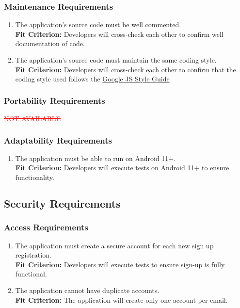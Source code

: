 \documentclass[12pt,letterpaper]{article}
\begin{document}
\subsubsection{Maintenance Requirements}
\begin{enumerate}[{MP}1.] 
	\item The application's source code must be well commented. \\
	{\textbf{Fit Criterion:} Developers will cross-check each other to confirm well documentation of code. }
	\item The application's source code must maintain the same coding style. \\
	{\textbf{Fit Criterion:} Developers will cross-check each other to confirm that the coding style used follows the \href{https://google.github.io/styleguide/jsguide.html}{\color{blue}Google JS Style Guide}}
\end{enumerate}

\subsubsection{Portability Requirements}
\textcolor{red}{\sout{NOT AVAILABLE}}
\subsubsection{Adaptability Requirements}
\begin{enumerate}[resume*] 
	\item The application must be able to run on Android 11+. \\
	{\textbf{Fit Criterion:} Developers will execute tests on Android 11+ to ensure functionality. }
\end{enumerate}
\subsection{Security Requirements}
\subsubsection{Access Requirements}
\begin{enumerate}[{SE}1.] 
	\item The application must create a secure account for each new sign up registration. \\
	{\textbf{Fit Criterion:} Developers will execute tests to ensure sign-up is fully functional. }
	\item The application cannot have duplicate accounts.  \\
	{\textbf{Fit Criterion:} The application will create only one account per email. }
\end{enumerate}
\end{document}
